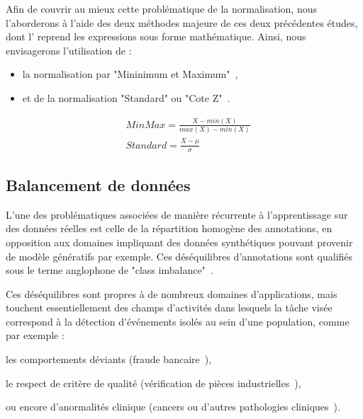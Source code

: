 Afin de couvrir au mieux cette problématique de la normalisation, nous l'aborderons à l'aide des deux méthodes majeure de ces deux précédentes études, dont l' reprend les expressions sous forme mathématique. Ainsi, nous envisagerons l'utilisation de :
\begin{itemize}
    \item la normalisation par "Mininimum et Maximum"~\cite{Juszczak2002},
    \item et de la normalisation "Standard" ou "Cote Z"~\cite{Celebi2007}.
\end{itemize}\par

\begin{equation} 
    \label{eq:scaling_methods}
    \begin{split}
    &MinMax=\frac{X-min(X)}{max(X)-min(X)}  \\
    &Standard=\frac{X-\mu{}}{\sigma}	    
    \end{split}
\end{equation}

\subsection{Balancement de données}
L'une des problématiques associées de manière récurrente à l'apprentissage sur des données réelles est celle de la répartition homogène des annotations, en opposition aux domaines impliquant des données synthétiques pouvant provenir de modèle génératifs par exemple. Ces déséquilibres d'annotations sont qualifiés sous le terme anglophone de "class imbalance"~\cite{Prati2009, He2009}.\par

Ces déséquilibres sont propres à de nombreux domaines d'applications, mais touchent essentiellement des champs d'activités dans lesquels la tâche visée correspond à la détection d'événements isolés au sein d'une population, comme par exemple : 
\begin{inlinerate}
    \item les comportements déviants (fraude bancaire~\cite{Phua2004}),
    \item le respect de critère de qualité (vérification de pièces industrielles~\cite{Wu2018}),
    \item ou encore d'anormalités clinique (cancers ou d'autres pathologies cliniques~\cite{Celebi2007}).
\end{inlinerate}\par

